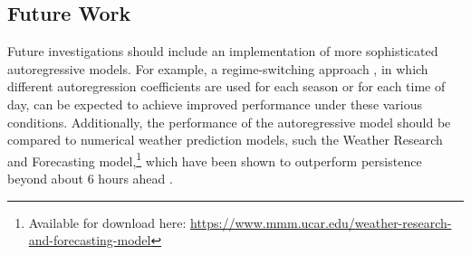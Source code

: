 \documentclass[11pt, oneside]{article}
\begin{document}
\subsection{Future Work}
Future investigations should include an implementation of more sophisticated autoregressive models.
For example, a regime-switching approach \citep[see][for example]{ZwiersVonStorch1990, Gneiting2006}, in which different autoregression coefficients are used for each season or for each time of day, can be expected to achieve improved performance under these various conditions.
Additionally, the performance of the autoregressive model should be compared to numerical weather prediction models, such the Weather Research and Forecasting model,\footnote{Available for download here: \url{https://www.mmm.ucar.edu/weather-research-and-forecasting-model}} which have been shown to outperform persistence beyond about 6 hours ahead \citep{Giebel2011,LandbergWatson1994}.



\end{document}
